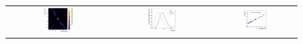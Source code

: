 \begin{figure}
    \centering
    \begin{tabular}{ccc}
 \includegraphics[width=0.3\textwidth]{plt_axis.png} & \includegraphics[width=0.3\textwidth]{long_pow.png} & \includegraphics[width=0.3\textwidth]{XvXrit.png}  \\
 

\end{tabular}
\end{figure}
